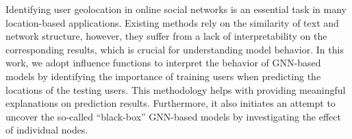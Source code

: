 Identifying user geolocation in online social networks is an essential task in many location-based applications. Existing methods rely on the similarity of text and network structure, however, they suffer from a lack of interpretability on the corresponding results, which is crucial for understanding model behavior. In this work, we adopt influence functions to interpret the behavior of GNN-based models by identifying the importance of training users when predicting the locations of the testing users. This methodology helps with providing meaningful explanations on prediction results. Furthermore, it also initiates an attempt to uncover the so-called ``black-box'' GNN-based models by investigating the effect of individual nodes.
